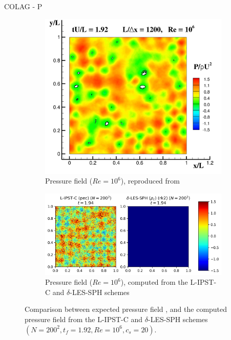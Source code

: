 COLAG - P 
\begin{figure}[htbp!]
  \centering
  \begin{subfigure}{10cm}
    \includegraphics[width=10cm]{Code-Figures/ext-force-tgv/colag_p_t_1.92.png}
    \caption{Pressure field ($Re = 10^6$), reproduced from \cite{Colagrossi2021QuasiLagrangian}}
  \end{subfigure}
  \vspace{2cm}
  \begin{subfigure}{14cm}
    \includegraphics[width=14cm]{Code-Figures/ext-force-tgv/p_t_1.92.png}
    \caption{Pressure field ($Re = 10^6$), computed from the L-IPST-C and $\delta$-LES-SPH schemes}
  \end{subfigure}
  \caption{Comparison between expected pressure field \parencite{Colagrossi2021QuasiLagrangian}, and the computed pressure field from the L-IPST-C and $\delta$-LES-SPH schemes $(N=200^2, t_f=1.92, Re=10^6, c_s=20)$.}
  \label{fig:tgv-forced-colag-p}
\end{figure}


